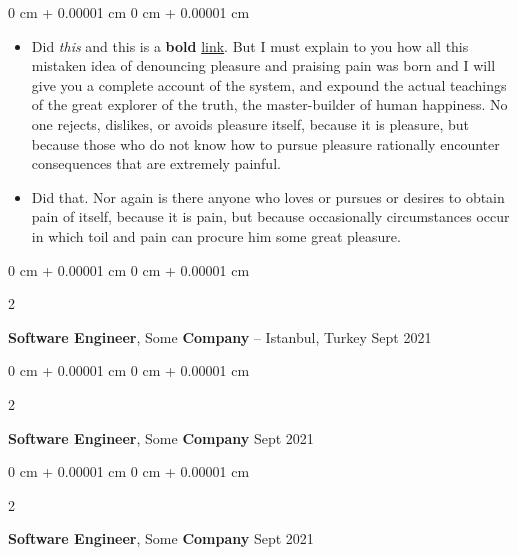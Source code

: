 \documentclass[10pt, letterpaper]{article}
\newenvironment{highlights}{
    \begin{itemize}[
        topsep=0.10 cm,
        parsep=0.10 cm,
        partopsep=0pt,
        itemsep=0pt,
        leftmargin=0 cm + 10pt
    ]
}{
    \end{itemize}
} %
\newenvironment{onecolentry}{
    \begin{adjustwidth}{
        0 cm + 0.00001 cm
    }{
        0 cm + 0.00001 cm
    }
}{
    \end{adjustwidth}
} %
\newenvironment{twocolentry}[2][]{
    \onecolentry
    \def\secondColumn{#2}
    \setcolumnwidth{\fill, 4.5 cm}
    \begin{paracol}{2}
}{
    \switchcolumn \raggedleft \secondColumn
    \end{paracol}
    \endonecolentry
} %
\begin{document}
        \vspace{0.10 cm}
        \begin{onecolentry}
            \begin{highlights}
                \item Did \textit{this} and this is a \textbf{bold} \href{https://example.com}{link}. But I must explain to you how all this mistaken idea of denouncing pleasure and praising pain was born and I will give you a complete account of the system, and expound the actual teachings of the great explorer of the truth, the master-builder of human happiness. No one rejects, dislikes, or avoids pleasure itself, because it is pleasure, but because those who do not know how to pursue pleasure rationally encounter consequences that are extremely painful.
                \item Did that. Nor again is there anyone who loves or pursues or desires to obtain pain of itself, because it is pain, but because occasionally circumstances occur in which toil and pain can procure him some great pleasure.
            \end{highlights}
        \end{onecolentry}


        \vspace{0.2 cm}

        \begin{twocolentry}{
            Sept 2021
        }
            \textbf{Software Engineer}, Some \textbf{Company} -- Istanbul, Turkey\end{twocolentry}



        \vspace{0.2 cm}

        \begin{twocolentry}{
            Sept 2021
        }
            \textbf{Software Engineer}, Some \textbf{Company}\end{twocolentry}



        \vspace{0.2 cm}

        \begin{twocolentry}{
            Sept 2021
        }
            \textbf{Software Engineer}, Some \textbf{Company}\end{twocolentry}



        \vspace{0.2 cm}
\end{document}
